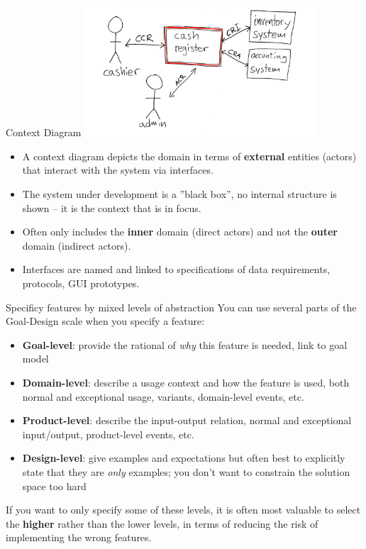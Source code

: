 \documentclass{simpleslides}
\begin{document}
\begin{frame}[fragile]{Context Diagram}
\vspace{1em}\hspace{6em}%
\includegraphics[width=0.65\textwidth]{img/context-diagram-cash-register}
\begin{itemize}
\item A context diagram depicts the domain in terms of \textbf{external} entities (actors) that interact with the system via interfaces.
\item The system under development is a ''black box'', no internal structure is shown -- it is the context that is in focus.
\item Often only includes the \textbf{inner} domain (direct actors) and not the \textbf{outer} domain (indirect actors).
\item Interfaces are named and linked to specifications of data requirements, protocols, GUI prototypes.
\end{itemize}

\end{frame}

\begin{frame}[fragile]{Specificy features by mixed levels of abstraction}
You can use several parts of the Goal-Design scale when you specify a feature:
  \begin{itemize}
\item \textbf{Goal-level}: provide the rational of \emph{why} this feature is needed, link to goal model 
\item \textbf{Domain-level}: describe a usage context and how the feature is used, both normal and exceptional usage, variants, domain-level events, etc.
\item \textbf{Product-level}: describe the input-output relation, normal and exceptional input/output, product-level events, etc.
\item \textbf{Design-level}: give examples and expectations but often best to explicitly state that they are \emph{only} examples; you don't want to constrain the solution space too hard
\end{itemize}
If you want to only specify some of these levels, it is often most valuable to select the \textbf{higher} rather than the lower levels, in terms of reducing the risk of implementing the wrong features.
\end{frame}
\end{document}
